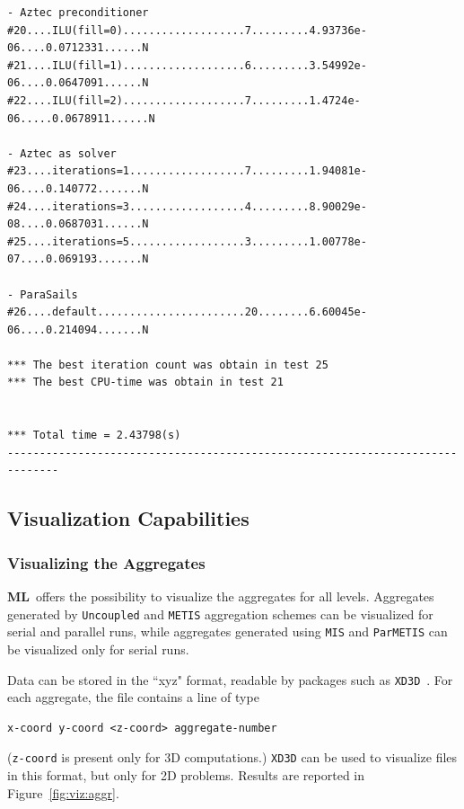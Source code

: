 \documentclass{article}[11pt]
\newcommand{\ML}     {{\bf ML}}
\begin{document}
\begin{verbatim}
- Aztec preconditioner
#20....ILU(fill=0)...................7.........4.93736e-06....0.0712331......N
#21....ILU(fill=1)...................6.........3.54992e-06....0.0647091......N
#22....ILU(fill=2)...................7.........1.4724e-06.....0.0678911......N

- Aztec as solver
#23....iterations=1..................7.........1.94081e-06....0.140772.......N
#24....iterations=3..................4.........8.90029e-08....0.0687031......N
#25....iterations=5..................3.........1.00778e-07....0.069193.......N

- ParaSails
#26....default.......................20........6.60045e-06....0.214094.......N

*** The best iteration count was obtain in test 25
*** The best CPU-time was obtain in test 21


*** Total time = 2.43798(s)
------------------------------------------------------------------------------
\end{verbatim}


\subsection{Visualization Capabilities}

\subsubsection{Visualizing the Aggregates}
\label{sec:viz:aggre}

\ML~offers the possibility to visualize the aggregates for all levels. 
Aggregates generated by {\tt Uncoupled} and {\tt METIS} aggregation schemes
can be visualized for serial and parallel runs, while aggregates generated
using {\tt MIS} and {\tt ParMETIS} can be visualized only for serial runs.

Data can be stored in the ``xyz" format, readable by packages such as
\verb!XD3D!~\cite{xd3d-home-page}.
For each aggregate, the file contains a line of type
\begin{verbatim}
x-coord y-coord <z-coord> aggregate-number
\end{verbatim}
(\verb!z-coord! is present only for 3D computations.) 
\verb!XD3D! can be used to visualize files in this format, but only for 2D
problems.
Results are reported in Figure~\ref{fig:viz:aggr}.
\end{document}
